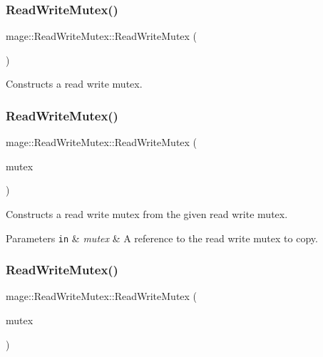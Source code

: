 \subsubsection{\texorpdfstring{Read\+Write\+Mutex()}{ReadWriteMutex()}\hspace{0.1cm}{\footnotesize\ttfamily [1/3]}}
{\footnotesize\ttfamily mage\+::\+Read\+Write\+Mutex\+::\+Read\+Write\+Mutex (\begin{DoxyParamCaption}{ }\end{DoxyParamCaption})}

Constructs a read write mutex. \hypertarget{structmage_1_1_read_write_mutex_aacb2f69e7e2b084147e1e45628e9dd67}{}\label{structmage_1_1_read_write_mutex_aacb2f69e7e2b084147e1e45628e9dd67} 
\subsubsection{\texorpdfstring{Read\+Write\+Mutex()}{ReadWriteMutex()}\hspace{0.1cm}{\footnotesize\ttfamily [2/3]}}
{\footnotesize\ttfamily mage\+::\+Read\+Write\+Mutex\+::\+Read\+Write\+Mutex (\begin{DoxyParamCaption}\item[{const \hyperlink{structmage_1_1_read_write_mutex}{Read\+Write\+Mutex} \&}]{mutex }\end{DoxyParamCaption})\hspace{0.3cm}{\ttfamily [delete]}}

Constructs a read write mutex from the given read write mutex.


\begin{DoxyParams}[1]{Parameters}
\mbox{\tt in}  & {\em mutex} & A reference to the read write mutex to copy. \\
\hline
\end{DoxyParams}
\hypertarget{structmage_1_1_read_write_mutex_ab5cc5ca0afcca8a994c6468033a501bf}{}\label{structmage_1_1_read_write_mutex_ab5cc5ca0afcca8a994c6468033a501bf} 
\subsubsection{\texorpdfstring{Read\+Write\+Mutex()}{ReadWriteMutex()}\hspace{0.1cm}{\footnotesize\ttfamily [3/3]}}
{\footnotesize\ttfamily mage\+::\+Read\+Write\+Mutex\+::\+Read\+Write\+Mutex (\begin{DoxyParamCaption}\item[{\hyperlink{structmage_1_1_read_write_mutex}{Read\+Write\+Mutex} \&\&}]{mutex }\end{DoxyParamCaption})\hspace{0.3cm}{\ttfamily [default]}}

